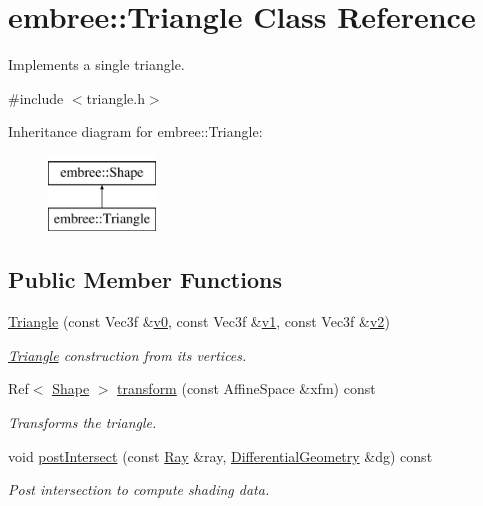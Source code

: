 \hypertarget{classembree_1_1_triangle}{
\section{embree::Triangle Class Reference}
\label{classembree_1_1_triangle}
}


Implements a single triangle.  




{\ttfamily \#include $<$triangle.h$>$}

Inheritance diagram for embree::Triangle:\begin{figure}[H]
\begin{center}
\leavevmode
\includegraphics[height=2.000000cm]{classembree_1_1_triangle}
\end{center}
\end{figure}
\subsection*{Public Member Functions}
\begin{DoxyCompactItemize}
\item 
\hyperlink{classembree_1_1_triangle_ae1dbfc77fbab52ea17880ae415df4c14}{Triangle} (const Vec3f \&\hyperlink{classembree_1_1_triangle_ac196941206e28259cde3a53d85d0e2d7}{v0}, const Vec3f \&\hyperlink{classembree_1_1_triangle_afa24c04d894b0ef9fda12873ac5aa12f}{v1}, const Vec3f \&\hyperlink{classembree_1_1_triangle_a8637eb32ee174a4466d8ba4bfee81ee1}{v2})
\begin{DoxyCompactList}\small\item\em \hyperlink{classembree_1_1_triangle}{Triangle} construction from its vertices. \item\end{DoxyCompactList}\item 
Ref$<$ \hyperlink{classembree_1_1_shape}{Shape} $>$ \hyperlink{classembree_1_1_triangle_a53d1f5916d7066466b66c301488f64ef}{transform} (const AffineSpace \&xfm) const 
\begin{DoxyCompactList}\small\item\em Transforms the triangle. \item\end{DoxyCompactList}\item 
void \hyperlink{classembree_1_1_triangle_ada64fe08f46c32919169fe2cc73e9090}{postIntersect} (const \hyperlink{structembree_1_1_ray}{Ray} \&ray, \hyperlink{structembree_1_1_differential_geometry}{DifferentialGeometry} \&dg) const 
\begin{DoxyCompactList}\small\item\em Post intersection to compute shading data. \item\end{DoxyCompactList}\end{DoxyCompactItemize}
